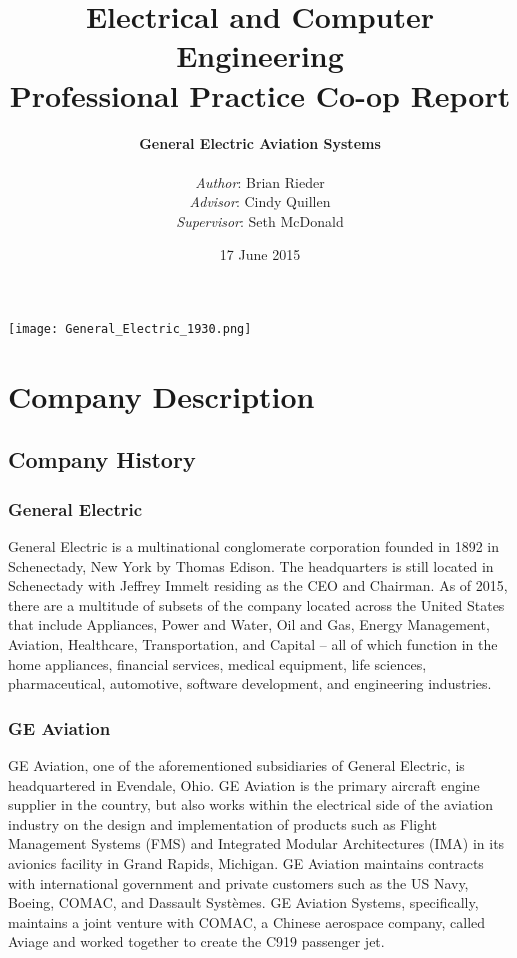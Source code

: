 \documentclass{article}
\title{Electrical and Computer Engineering \\ 
Professional Practice Co-op Report
}
\author{
\textbf{General Electric Aviation Systems} \\
\\
\textit{Author}:     Brian Rieder\\
\textit{Advisor}:    Cindy Quillen\\
\textit{Supervisor}: Seth McDonald
}
\date{17 June 2015}
\begin{document}
\maketitle
\begin{center}
  \texttt{[image: General\_Electric\_1930.png]}
\end{center}
\newpage

\tableofcontents
{}
\newpage


\section{Company Description}
\subsection{Company History}
\subsubsection{General Electric}
General Electric is a multinational conglomerate corporation founded in 1892 in Schenectady, New York by Thomas Edison. The headquarters is still located in Schenectady with Jeffrey Immelt residing as the CEO and Chairman. 
As of 2015, there are a multitude of subsets of the company located across the United States that include Appliances, Power and Water, Oil and Gas, Energy Management, Aviation, Healthcare, Transportation, and Capital -- all of which function in the home appliances, financial services, medical equipment, life sciences, pharmaceutical, automotive, software development, and engineering industries.
\subsubsection{GE Aviation}
GE Aviation, one of the aforementioned subsidiaries of General Electric, is headquartered in Evendale, Ohio. GE Aviation is the primary aircraft engine supplier in the country, but also works within the electrical side of the aviation industry on the design and implementation of products such as Flight Management Systems (FMS) and Integrated Modular Architectures (IMA) in its avionics facility in Grand Rapids, Michigan. 
GE Aviation maintains contracts with international government and private customers such as the US Navy, Boeing, COMAC, and Dassault Systèmes. 
GE Aviation Systems, specifically, maintains a joint venture with COMAC, a Chinese aerospace company, called Aviage and worked together to create the C919 passenger jet.
\end{document}
